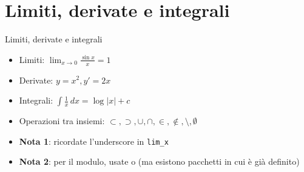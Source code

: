 \section{Limiti, derivate e integrali}
  \begin{frame}{Limiti, derivate e integrali}
    
    \begin{itemize}
      \item<1-> Limiti: $\lim_{x \to 0} \frac{\sin x}{x} = 1$
      \item<2-> Derivate: $y = x^2, y' = 2x$
      \item<3-> Integrali: $\int \frac{1}{x}\,dx = \log \lvert x \rvert + c$
      \item<4-> Operazioni tra insiemi: $\subset, \supset, \cup, \cap, \in, \notin, \setminus, \emptyset$
    \end{itemize}
    
    \begin{itemize}

    \item<5-> \textbf{Nota 1}: ricordate l'underscore in \texttt{lim_{x }}

    \item<5-> \textbf{Nota 2}: per il modulo, usate \texttt{\lvert} o \texttt{\rvert} (ma esistono pacchetti in cui è già definito)

    \end{itemize}

\end{frame}
